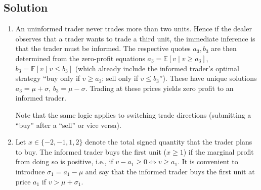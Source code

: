 \documentclass[a4paper]{article}
\begin{document}
\subsection*{Solution}
\begin{enumerate}
	\item An uninformed trader never trades more than two units. Hence if the dealer observes that a trader wants to trade a third unit, the immediate inference is that the trader must be informed. The respective quotes $a_3,b_3$ are then determined from the zero-profit equations $a_3 = \mathbb{E} [v \mid v \geq a_3]$, $b_3 = \mathbb{E} [v \mid v \leq b_3]$ (which already include the informed trader's optimal strategy ``buy only if $v \geq a_3$; sell only if $v \leq b_3$'').
	These have unique solutions $a_3 = \mu + \sigma$, $b_3 = \mu - \sigma$. Trading at these prices yields zero profit to an informed trader.
	
	Note that the same logic applies to switching trade directions (submitting a ``buy'' after a ``sell'' or vice versa). 
	
	\item Let $x \in \{-2,-1,1,2\}$ denote the total signed quantity that the trader plans to buy.
	The informed trader buys the first unit ($x \geq 1$) if the marginal profit from doing so is positive, i.e., if $v - a_1 \geq 0 \iff v \geq a_1$. It is convenient to introduce $\sigma_1 = a_1 - \mu$ and say that the informed trader buys the first unit at price $a_1$ if $v > \mu + \sigma_1$. %
	

\end{enumerate}
\end{document}
